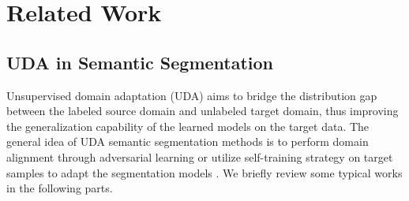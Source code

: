 \documentclass[final]{cvpr}
\begin{document}
\iffalse
\begin{itemize}
\vspace{-0.2cm}
\item We propose a novel DMLC strategy for UDA, where we formulate the misclassification probability of inter-classes (NTM) to model noise distribution in target domain and devise a domain-aware meta-learning strategy to estimate NTM for loss correction in a data driven way. To our best knowledge, it is the first time that the noise distribution of pseudo labels in target domain is formally modeled by a learnable NTM for UDA and further solved in a meta-learning manner. 
\vspace{-0.2cm}
  \item We present a MetaCorrection framework to provide matched compatible supervision signals for different layers with the proposed DMLC strategy, boosting the adaptation performance of model. 
\vspace{-0.2cm}
  \item We conduct extensive comparison experiments and ablation studies to thoroughly verify the impact and effect of the proposed MetaCorrection framework. 
\end{itemize}

\fi


\vspace{-0.4cm}
\section{Related Work}
\vspace{-0.2cm}
\subsection{UDA in Semantic Segmentation}
\vspace{-0.2cm}
Unsupervised domain adaptation (UDA) aims to bridge the distribution gap between the labeled source domain and unlabeled target domain, thus improving the generalization capability of the learned models on the target data. The general idea of UDA semantic segmentation methods is to perform domain alignment through adversarial learning \cite{chen2019synergistic, chen2019learning, chen2019crdoco, choi2019self, du2019ssf, kim2020learning, li2019bidirectional, luo2019taking, tsai2018learning, tsai2019domain} or utilize self-training strategy on target samples to adapt the segmentation models  \cite{chen2019domain, iqbal2020mlsl, lian2019constructing, mei2020instance, pan2020unsupervised, sakaridis2019guided, zhang2019category, zheng2020rectifying, zhu2020improving, zou2019confidence, zou2018unsupervised}. We briefly review some typical works in the following parts.
\end{document}
